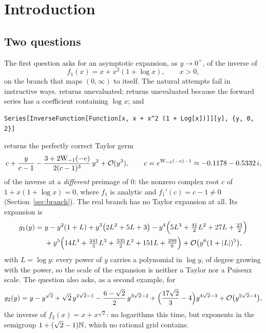 \section{Introduction}
\label{sec:intro}

\subsection{Two questions}

The first question \cite{q1} asks for an asymptotic expansion, as $y\to0^+$, of the inverse of
\begin{equation}
 f_1(x)=x+x^2(1+\log x),\qquad x>0,
 \label{eq:f1}
\end{equation}
on the branch that maps $(0,\infty)$ to itself. The natural attempts fail in instructive ways.
 returns unevaluated;  returns unevaluated because the forward series has a coefficient containing $\log x$; and
\begin{lstlisting}
Series[InverseFunction[Function[x, x + x^2 (1 + Log[x])]][y], {y, 0, 2}]
\end{lstlisting}
returns the perfectly correct Taylor germ
\begin{equation}
 c+\frac{y}{c-1}-\frac{3+2\mathrm W_{-1}(-e)}{2(c-1)^3}\,y^2+\mathcal O(y^3),\qquad c=e^{\mathrm W_{-1}(-e)-1}\approx-0.1178-0.5332\,i,
 \label{eq:complex-germ}
\end{equation}
of the inverse at a \emph{different} preimage of $0$: the nonzero complex root $c$ of $1+x(1+\log x)=0$, where $f_1$ is analytic and $f_1'(c)=c-1\ne0$ (Section~\ref{sec:branch}). The real branch has no Taylor expansion at all. Its expansion is
\begin{equation}
\begin{aligned}
 g_1(y)={}&y-y^2(1+L)+y^3\bigl(2L^2+5L+3\bigr)-y^4\Bigl(5L^3+\tfrac{41}{2}L^2+27L+\tfrac{23}{2}\Bigr)\\
 &+y^5\Bigl(14L^4+\tfrac{241}{3}L^3+\tfrac{335}{2}L^2+151L+\tfrac{299}{6}\Bigr)+\mathcal O\bigl(y^6(1+|L|)^5\bigr),
\end{aligned}
 \label{eq:answer1}
\end{equation}
with $L=\log y$: every power of $y$ carries a polynomial in $\log y$, of degree growing with the power, so the scale of the expansion is neither a Taylor nor a Puiseux scale. The question also asks, as a second example, for
\begin{equation}
 g_2(y)=y-y^{\sqrt2}+\sqrt2\,y^{2\sqrt2-1}-\frac{6-\sqrt2}{2}\,y^{3\sqrt2-2}+\Bigl(\frac{17\sqrt2}{3}-4\Bigr)y^{4\sqrt2-3}+\mathcal O\bigl(y^{5\sqrt2-4}\bigr),
 \label{eq:answer2}
\end{equation}
the inverse of $f_2(x)=x+x^{\sqrt2}$: no logarithms this time, but exponents in the semigroup $1+(\sqrt2-1)\mathbb N$, which no rational grid contains.

